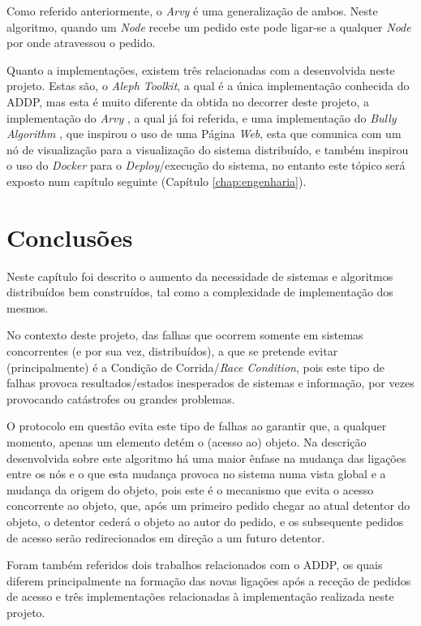 Como referido anteriormente, o \emph{Arvy} é uma generalização de ambos.
Neste algoritmo, quando um \emph{Node} recebe um pedido este pode ligar-se a qualquer \emph{Node} por onde atravessou o pedido.


Quanto a implementações, existem três relacionadas com a desenvolvida neste projeto. 
Estas são, o \emph{Aleph Toolkit}\cite{aleph}, a qual é a única implementação conhecida do \acs*{ADDP}, mas esta é muito diferente da obtida no decorrer deste projeto, 
a implementação do \emph{Arvy} \cite{ArvyImpl}, a qual já foi referida, 
e uma implementação do \emph{Bully Algorithm} \cite{bully}, que inspirou o uso de uma Página \emph{Web}, esta que comunica com um nó de visualização para a visualização do sistema distribuído, e 
também inspirou o uso do \emph{Docker} para o \emph{Deploy}/execução do sistema, no entanto este tópico será exposto num capítulo seguinte (Capítulo \ref{chap:engenharia}).



\section{Conclusões}
\label{motivacao:sec:conclusao}

Neste capítulo foi descrito o aumento da necessidade de sistemas e algoritmos distribuídos bem construídos, tal como a complexidade de implementação dos mesmos.

No contexto deste projeto, das falhas que ocorrem somente em sistemas concorrentes (e por sua vez, distribuídos), a que se pretende evitar (principalmente)
é a Condição de Corrida/\emph{Race Condition},
pois este tipo de falhas provoca resultados/estados inesperados de sistemas e informação, por vezes provocando catástrofes ou grandes problemas.

O protocolo em questão evita este tipo de falhas ao garantir que, a qualquer momento, apenas um elemento detém o (acesso ao) objeto.
Na descrição desenvolvida sobre este algoritmo há uma maior ênfase na mudança das ligações entre os nós e o que esta mudança provoca no sistema numa vista global e a mudança da origem do objeto,
pois este é o mecanismo que evita o acesso concorrente ao objeto, que, após um primeiro pedido chegar ao atual detentor do objeto, o detentor cederá o objeto ao autor do pedido,
e os subsequente pedidos de acesso serão redirecionados em direção a um futuro detentor.

Foram também referidos dois trabalhos relacionados com o \acs*{ADDP}, os quais diferem principalmente na formação das novas ligações após a receção de pedidos de acesso e três implementações
relacionadas à implementação realizada neste projeto.

